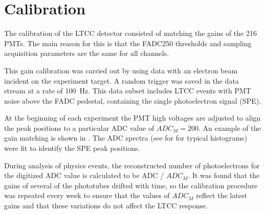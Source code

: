 \section{Calibration}

The calibration of the LTCC detector consisted of matching the gains of the 216 PMTs. The main reason for this
is that the FADC250 thresholds and sampling acquisition parameters are the same for all channels.


This gain calibration was carried out by using data with an electron beam incident on the experiment target.
A random trigger was saved in the data stream at a rate of 100~Hz. This data subset includes LTCC events with
PMT noise above the FADC pedestal, containing the single photoelectron signal (SPE).

At the beginning of each experiment the PMT high voltages are adjusted to align the peak positions
to a particular ADC value of $ADC_M = 200$. An example of the gain matching is shown in .
The ADC spectra (see for  for typical histograms) were fit to identify the SPE peak positions.

During analysis of physics events, the reconstructed number of photoelectrons for the digitized ADC value is
calculated to be ADC / $ADC_M$. It was found that the gains of several of the phototubes drifted with time, so
the calibration procedure was repeated every week to ensure that the values of $ADC_M$ reflect the latest
gains and that these variations do not affect the LTCC response.

